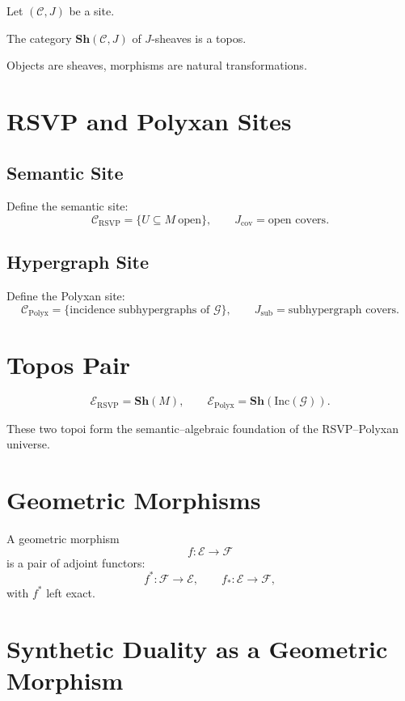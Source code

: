 Let $(\mathcal{C},J)$ be a site.

\begin{definition}
The category $\mathbf{Sh}(\mathcal{C},J)$ of $J$-sheaves is a topos.
\end{definition}

Objects are sheaves, morphisms are natural transformations.

\section{RSVP and Polyxan Sites}

\subsection{Semantic Site}

Define the semantic site:
\[
\mathcal{C}_{\mathrm{RSVP}}
  = \{ U\subseteq M \ \text{open} \},
\qquad
J_{\mathrm{cov}} = \text{open covers}.
\]

\subsection{Hypergraph Site}

Define the Polyxan site:
\[
\mathcal{C}_{\mathrm{Polyx}}
  = \{\text{incidence subhypergraphs of $\mathcal{G}$}\},
\qquad
J_{\mathrm{sub}} = \text{subhypergraph covers}.
\]

\section{Topos Pair}

\[
\mathscr{E}_{\mathrm{RSVP}} = \mathbf{Sh}(M),
\qquad
\mathscr{E}_{\mathrm{Polyx}} = \mathbf{Sh}(\mathrm{Inc}(\mathcal{G})).
\]

These two topoi form the semantic–algebraic foundation of the RSVP–Polyxan universe.

\section{Geometric Morphisms}

A geometric morphism
\[
f : \mathscr{E} \to \mathscr{F}
\]
is a pair of adjoint functors:
\[
f^\ast : \mathscr{F}\to \mathscr{E}, \qquad
f_\ast : \mathscr{E}\to \mathscr{F},
\]
with $f^\ast$ left exact.

\section{Synthetic Duality as a Geometric Morphism}

